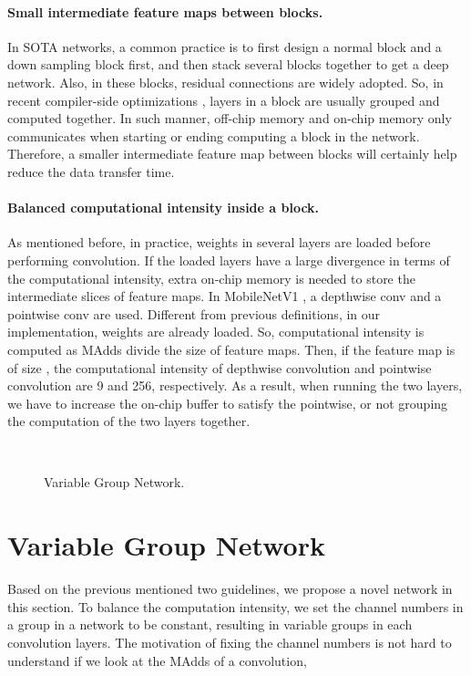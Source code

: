 \documentclass{article}
\begin{document}
\paragraph{Small intermediate feature maps between blocks.}
In SOTA networks, a common practice is to first design a normal block and a down sampling block first, and then stack several blocks together to get a deep network. 
Also, in these blocks, residual connections \cite{he2016deep} are widely adopted. So, in recent compiler-side optimizations \cite{xing2019dnnvm}
, layers in a block are usually grouped and computed together. 
In such manner, off-chip memory and on-chip memory only communicates when starting or ending computing a block in the network.
Therefore, a smaller intermediate feature map between blocks will certainly help reduce the data transfer time.

\paragraph{Balanced computational intensity inside a block.}
As mentioned before, in practice, weights in several layers are loaded before performing convolution. If the loaded layers have a large divergence in terms of the computational intensity, extra on-chip memory is needed to store the intermediate slices of feature maps. In MobileNetV1 \cite{howard2017mobilenets}, a depthwise conv and a pointwise conv are used. Different from previous definitions, in our implementation, weights are already loaded. So, computational intensity is computed as MAdds divide the size of feature maps. Then, if the feature map is of size , the computational intensity of depthwise convolution and pointwise convolution are 9 and 256, respectively. 
As a result, when running the two layers, we have to increase the on-chip buffer to satisfy the pointwise, or not grouping the computation of the two layers together.



\begin{figure}
  \centering
    \quad
   \\
  \caption{Variable Group Network.} \label{fig:vargnet}
\end{figure}

\section{Variable Group Network}
Based on the previous mentioned two guidelines, we propose a novel network in this section. To balance the computation intensity, we set the channel numbers in a group in a network to be constant, resulting in variable groups in each convolution layers. 
The motivation of fixing the channel numbers is not hard to understand if we look at the MAdds of a convolution,
\end{document}
